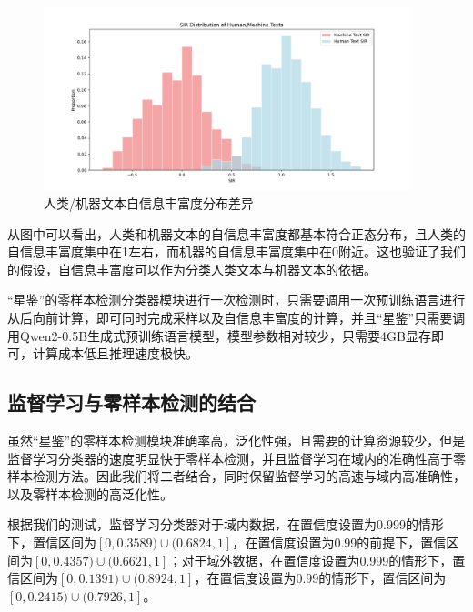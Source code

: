 \documentclass[a4paper]{report}
\begin{document}
\begin{figure}[H]
	\centering
	\includegraphics[width=0.95\textwidth]{figures/SIR.png}
	\caption{人类/机器文本自信息丰富度分布差异}
	\label{fig:SIR}
\end{figure}

从图中可以看出，人类和机器文本的自信息丰富度都基本符合正态分布，且人类的自信息丰富度集中在1左右，而机器的自信息丰富度集中在0附近。这也验证了我们的假设，自信息丰富度可以作为分类人类文本与机器文本的依据。

“星鉴”的零样本检测分类器模块进行一次检测时，只需要调用一次预训练语言进行从后向前计算，即可同时完成采样以及自信息丰富度的计算，并且“星鉴”只需要调用Qwen2-0.5B生成式预训练语言模型，模型参数相对较少，只需要4GB显存即可，计算成本低且推理速度极快。


\subsection{监督学习与零样本检测的结合}
虽然“星鉴”的零样本检测模块准确率高，泛化性强，且需要的计算资源较少，但是监督学习分类器的速度明显快于零样本检测，并且监督学习在域内的准确性高于零样本检测方法。因此我们将二者结合，同时保留监督学习的高速与域内高准确性，以及零样本检测的高泛化性。

根据我们的测试，监督学习分类器对于域内数据，在置信度设置为0.999的情形下，置信区间为$[0,0.3589)\cup(0.6824,1]$，在置信度设置为0.99的前提下，置信区间为$[0,0.4357)\cup(0.6621,1]$；对于域外数据，在置信度设置为0.999的情形下，置信区间为$[0, 0.1391) \cup (0.8924, 1]$，在置信度设置为0.99的情形下，置信区间为$[0,0.2415)\cup(0.7926,1]$。
\end{document}
